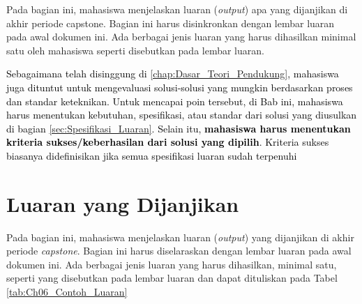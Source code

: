 Pada bagian ini, mahasiswa menjelaskan luaran (\textit{output}) apa yang dijanjikan di akhir periode capstone. Bagian ini harus disinkronkan dengan lembar luaran pada awal dokumen ini. Ada berbagai jenis luaran yang harus dihasilkan minimal satu oleh mahasiswa seperti disebutkan pada lembar luaran.

\textcolor{black}{Sebagaimana telah disinggung di \ref{chap:Dasar_Teori_Pendukung}, mahasiswa juga dituntut untuk mengevaluasi solusi-solusi yang mungkin berdasarkan proses dan standar keteknikan. Untuk mencapai poin tersebut, di Bab ini, mahasiswa harus menentukan kebutuhan, spesifikasi, atau standar dari solusi yang diusulkan di bagian \ref{sec:Spesifikasi_Luaran}. Selain itu, \textbf{mahasiswa harus menentukan kriteria sukses/keberhasilan dari solusi yang dipilih}. Kriteria sukses biasanya didefinisikan jika semua spesifikasi luaran sudah terpenuhi} 

\section{Luaran yang Dijanjikan}
\label{sec:Luaran_yang_Dijanjikan}


    Pada bagian ini, mahasiswa menjelaskan luaran (\textit{output}) yang dijanjikan di akhir periode \textit{capstone}. Bagian ini harus diselaraskan dengan lembar luaran pada awal dokumen ini. Ada berbagai jenis luaran yang harus dihasilkan, minimal satu, seperti yang disebutkan pada lembar luaran dan dapat dituliskan pada Tabel \ref{tab:Ch06_Contoh_Luaran}
    
